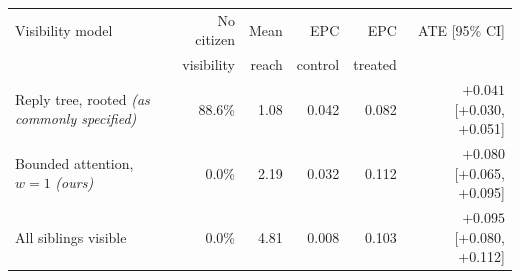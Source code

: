 \begin{tabular}{lrrrrr}
\toprule
Visibility model & No citizen & Mean & EPC & EPC & ATE [95\% CI] \\
 & visibility & reach & control & treated & \\
\midrule
Reply tree, rooted \emph{(as commonly specified)} & 88.6\% & 1.08 & 0.042 & 0.082 & $+0.041$ [+0.030, +0.051] \\
Bounded attention, $w=1$ \emph{(ours)} & 0.0\% & 2.19 & 0.032 & 0.112 & $+0.080$ [+0.065, +0.095] \\
All siblings visible & 0.0\% & 4.81 & 0.008 & 0.103 & $+0.095$ [+0.080, +0.112] \\
\bottomrule
\end{tabular}
